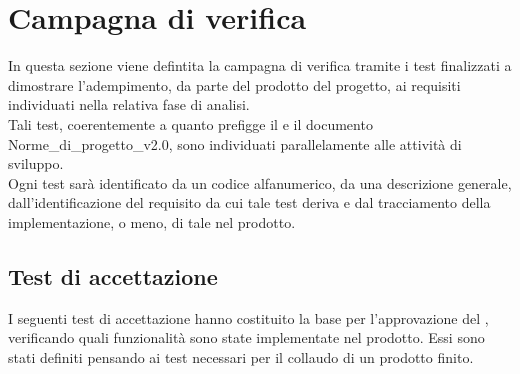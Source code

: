 \section{Campagna di verifica} \label{sec:test}
In questa sezione viene defintita la campagna di verifica tramite i test finalizzati a dimostrare l'adempimento, da parte del prodotto del progetto, ai requisiti individuati nella relativa fase di analisi.\\
Tali test, coerentemente a quanto prefigge il  e il documento Norme\_di\_progetto\_v2.0, sono individuati parallelamente alle attività di sviluppo.\\
Ogni test sarà identificato da un codice alfanumerico, da una descrizione generale, dall'identificazione del requisito da cui tale test deriva e dal tracciamento della implementazione, o meno, di tale nel prodotto.

\subsection{Test di accettazione}
I seguenti test di accettazione hanno costituito la base per l'approvazione del , verificando quali funzionalità sono state implementate nel prodotto. Essi sono stati definiti pensando ai test necessari per il collaudo di un prodotto finito.


